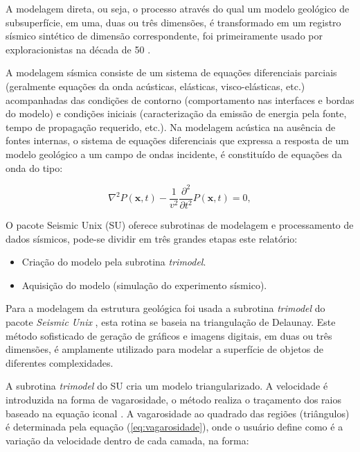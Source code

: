 A modelagem direta, ou seja, o processo através do qual um modelo geológico de subsuperfície, em uma, duas ou três dimensões, é transformado em um registro sísmico sintético de dimensão correspondente, foi primeiramente usado por exploracionistas na década de 50 \citep{Edwards(1988)}.

A modelagem sísmica consiste de um sistema de equações diferenciais parciais (geralmente equações da onda acústicas, elásticas, visco-elásticas, etc.) acompanhadas das condições de contorno (comportamento nas interfaces e bordas do modelo) e condições iniciais (caracterização da emissão de energia pela fonte, tempo de propagação requerido, etc.). Na modelagem acústica na ausência de fontes internas, o sistema de equações diferenciais que expressa a resposta de um modelo geológico a um campo de ondas incidente, é constituído de equações da onda do tipo:

\begin{equation}
\nabla^{2}P(\mathbf{x},t)-\frac{1}{v^{2}}\frac{\partial^{2}}{\partial t^{2}}P(\mathbf{x},t)= 0,
\label{eq:Equacao_onda_acustica_0}
\end{equation}


O pacote Seismic Unix (SU) oferece subrotinas de modelagem e processamento de dados sísmicos, pode-se dividir em três grandes etapas este relatório:

\begin{itemize}
	\item Criação do modelo pela subrotina \textit{trimodel}.
	\item Aquisição do modelo (simulação do experimento sísmico).
\end{itemize}

Para a modelagem da estrutura geológica foi usada a subrotina \textit{trimodel} do pacote \textit{Seismic Unix} \citep{STOCKWELL(2017)}, esta rotina se baseia na triangulação de Delaunay. Este método sofisticado de geração de gráficos e imagens digitais, em duas ou três dimensões, é amplamente utilizado para modelar
a superfície de objetos de diferentes complexidades.

A subrotina \textit{trimodel} do SU cria um modelo triangularizado. 
A velocidade é introduzida na forma de vagarosidade, o método realiza o traçamento dos raios baseado na equação iconal \citep{Forel(2005)}. A vagarosidade ao quadrado das regiões (triângulos) é determinada pela equação (\ref{eq:vagarosidade}), onde o usuário define como é a variação da velocidade dentro de cada camada, na forma:

